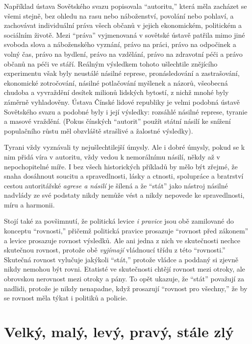 \documentclass{book}
\begin{document}
Například ústava Sovětského svazu popisovala \enquote{autoritu,} která měla zacházet se všemi stejně, bez ohledu na rasu nebo náboženství, povolání nebo pohlaví, a zachovávat individuální práva všech občanů v jejich ekonomickém, politickém a sociálním životě. Mezi \enquote{práva} vyjmenovaná v sovětské ústavě patřila mimo jiné svoboda slova a náboženského vyznání, právo na práci, právo na odpočinek a volný čas, právo na bydlení, právo na vzdělání, právo na zdravotní péči a právo občanů na péči ve stáří. Reálným výsledkem tohoto ušlechtile znějícího experimentu však byly neustálé násilné represe, pronásledování a zastrašování, ekonomické zotročování, násilné potlačování myšlenek a názorů, všeobecná chudoba a vyvraždění desítek milionů lidských bytostí, z nichž mnohé byly záměrně vyhladověny. Ústava Čínské lidové republiky je velmi podobná ústavě Sovětského svazu a podobné byly i její výsledky: rozsáhlé násilné represe, tyranie a masové vraždění. (Pokus čínských \enquote{autorit} použít státní násilí ke snížení populačního růstu měl obzvláště strašlivé a žalostné výsledky).

Tyrani vždy vyznávali ty nejušlechtilejší úmysly. Ale i dobré úmysly, pokud se k nim přidá víra v autoritu, vždy vedou k nemorálnímu násilí, někdy až v nepochopitelné míře. I bez všech historických příkladů by mělo být zřejmé, že snaha dosáhnout soucitu a spravedlnosti, lásky a ctnosti, spolupráce a bratrství cestou autoritářské \emph{agrese a násilí} je šílená a že \enquote{stát} jako nástroj násilné nadvlády ze své podstaty nikdy nemůže vést a nikdy nepovede ke spravedlnosti, míru a harmonii.

Stojí také za povšimnutí, že politická levice \emph{i pravice} jsou obě zamilované do konceptu \enquote{rovnosti,} přičemž politická pravice prosazuje \enquote{rovnost před zákonem} a levice prosazuje rovnost výsledků. Ale ani jedna z nich ve skutečnosti nechce skutečnou rovnost, protože obě \emph{vyjímají} vládnoucí třídu z této \enquote{rovnosti.} Skutečná rovnost vylučuje jakýkoli \enquote{stát,} protože vládce a poddaný si zjevně nikdy nemohou být rovni. Etatisté ve skutečnosti chtějí rovnost mezi otroky, ale obrovskou nerovnost mezi otroky a pány. To opět ukazuje, že \enquote{stát} považují za nadlidi, protože je nikdy nenapadne, když prosazují \enquote{rovnost pro všechny,} že by se rovnost měla týkat i politiků a policie.

\section{Velký, malý, levý, pravý, stále zlý}
\end{document}
